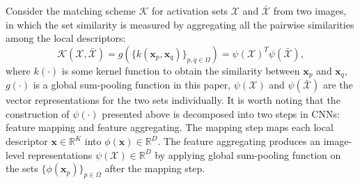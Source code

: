 \documentclass[a4paper,4pt]{article}
\begin{document}
Consider the matching scheme $\mathcal{K}$ for activation sets $\bm{\mathcal{X}}$ and $\bm{\bar{\mathcal{X}}}$
from two images, in which the set similarity is measured by aggregating all the pairwise
similarities among the local descriptors:
\begin{equation}\label{equa:k}
    \mathcal{K}(\bm{\mathcal{X}},\bm{\bar{\mathcal{X}}})
    =g(\{k(\bm{x}_p,\bm{x}_q)\}_{p,q\in \Omega})
    =\psi(\bm{\mathcal{X}})^T \psi(\bm{\bar{\mathcal{X}}} ),
\end{equation}
where $k(\cdot)$ is some kernel function to obtain the similarity between $\bm{x}_p$
and $\bm{x}_q$, $g(\cdot)$ is a global sum-pooling function in this paper, $\psi(\bm{\mathcal{X}})$ 
and $\psi(\bm{\bar{\mathcal{X}}})$ are the vector representations for the two sets individually. 
It is worth noting that the construction of $\psi(\cdot)$ presented above is decomposed
into two steps in CNNs: feature mapping and feature aggregating. The mapping step maps each
local descriptor $\bm{x} \in \mathbb{R}^K$  into $\phi(\bm{x}) \in \mathbb{R}^D$.
The feature aggregating produces an image-level representations 
$\psi(\bm{\mathcal{X}}) \in \mathbb{R}^D$ by applying global sum-pooling function
on the sets $\{\phi(\bm{x}_p)\}_{p\in \Omega}$
 after the mapping step. 
 
\end{document}
